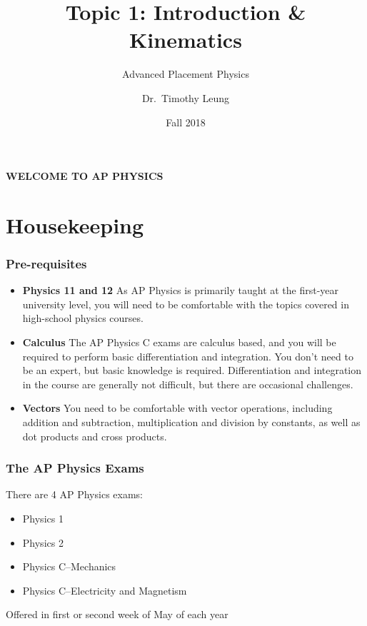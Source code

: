 \documentclass[12pt,compress,aspectratio=169]{beamer}
\title{Topic 1: Introduction \& Kinematics} %
\subtitle{Advanced Placement Physics}
\author[TML]{Dr.\ Timothy Leung}
\institute{Olympiads School}
\date{Fall 2018}
\begin{document}
\begin{frame}
  \frametitle{}
  {\LARGE
    \begin{center}
      \textbf{WELCOME TO AP PHYSICS}
    \end{center}
  }
\end{frame}


\section{Housekeeping}


\begin{frame}
  \frametitle{Pre-requisites}
  \begin{itemize}
  \item\textbf{Physics 11 and 12} As AP Physics is primarily taught at the
    first-year university level, you will need to be comfortable with the
    topics covered in high-school physics courses.
  \item\textbf{Calculus} The AP Physics C exams are calculus based, and you
    will be required to perform basic differentiation and integration. You
    don't need to be an expert, but basic knowledge is required.
    Differentiation and integration in the course are generally not
    difficult, but there are occasional challenges.
  \item\textbf{Vectors} You need to be comfortable with vector operations,
    including addition and subtraction, multiplication and division by
    constants, as well as dot products and cross products.
  \end{itemize}
\end{frame}



\begin{frame}
  \frametitle{The AP Physics Exams}
  There are 4 AP Physics exams:
  \begin{itemize}
  \item Physics 1
  \item Physics 2
  \item Physics C--Mechanics
  \item Physics C--Electricity and Magnetism
  \end{itemize}
  Offered in first or second week of May of each year
\end{frame}
\end{document}
